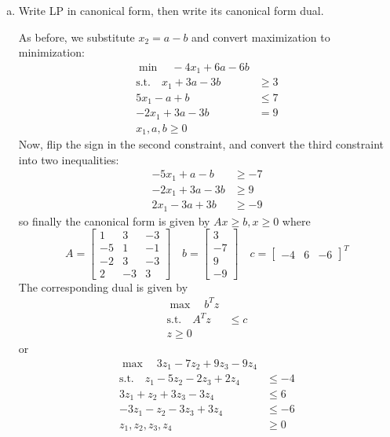 \documentclass{article}
\begin{document}
\begin{enumerate}
\begin{enumerate}[a)]
			\item Write LP in canonical form, then write its canonical form dual.
				\begin{soln}
					As before, we substitute $x_2=a-b$ and convert maximization to minimization:
					\begin{align*}
						\min\quad -4x_1+6a-6b & \\
						\text{s.t.}\quad x_1+3a-3b &\ge 3 \\
						5x_1-a+b &\le 7  \\
						-2x_1+3a-3b &= 9 \\
						x_1, a, b\ge 0
					\end{align*}
					Now, flip the sign in the second constraint, and convert the third constraint into two inequalities:
					\begin{align*}
						-5x_1+a-b &\ge -7 \\
						-2x_1+3a-3b &\ge 9 \\
						2x_1-3a+3b &\ge -9
					\end{align*} so finally the canonical form is given by $Ax\ge b, x\ge 0$ where \[ A=\begin{bmatrix}
							1 & 3 & -3 \\
							-5 & 1 & -1 \\
							-2 & 3 & -3 \\
							2 & -3 & 3
						\end{bmatrix}\quad b=\begin{bmatrix}
							3 \\ -7 \\ 9 \\ -9
						\end{bmatrix}\quad c=\begin{bmatrix}
							-4 & 6 & -6
					\end{bmatrix}^T\] The corresponding dual is given by
					\begin{align*}
						\max\quad b^T z & \\
						\text{s.t.}\quad A^T z&\le c \\
						z\ge 0
					\end{align*} or
					\begin{align*}
						\max\quad 3z_1-7z_2+9z_3-9z_4 & \\
						\text{s.t.}\quad z_1-5z_2-2z_3+2z_4 &\le -4 \\
						3z_1+z_2+3z_3-3z_4 &\le 6 \\
						-3z_1-z_2-3z_3+3z_4 &\le -6 \\
						z_1, z_2, z_3, z_4 &\ge 0
					\end{align*}
				\end{soln}


\end{enumerate}
\end{enumerate}
\end{document}
